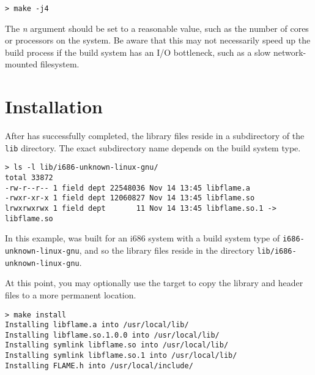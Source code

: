 \begin{Verbatim}[frame=single,framesep=2.5mm,xleftmargin=5mm,commandchars=\\\{\},fontsize=\footnotesize]
> make -j4
\end{Verbatim}

\noindent
The {\em n} argument should be set to a reasonable value, such as
the number of cores or processors on the system.
Be aware that this may not necessarily speed up the build process if the
build system has an I/O bottleneck, such as a slow network-mounted
filesystem.





\section{Installation}


After \make has successfully completed, the \libflame library files
reside in a subdirectory of the {\tt lib} directory.
The exact subdirectory name depends on the build system type.

\begin{Verbatim}[frame=single,framesep=2.5mm,xleftmargin=5mm,commandchars=\\\{\},fontsize=\footnotesize]
> ls -l lib/i686-unknown-linux-gnu/
total 33872
-rw-r--r-- 1 field dept 22548036 Nov 14 13:45 libflame.a
-rwxr-xr-x 1 field dept 12060827 Nov 14 13:45 libflame.so
lrwxrwxrwx 1 field dept       11 Nov 14 13:45 libflame.so.1 -> libflame.so
\end{Verbatim}

\noindent
In this example, \libflame was built for an i686 system with a
build system type of {\tt i686-unknown-linux-gnu}, and so the
library files reside in the directory
{\tt lib/i686-unknown-linux-gnu}.

At this point, you may optionally use the \install target to copy the
library and header files to a more permanent location.

\begin{Verbatim}[frame=single,framesep=2.5mm,xleftmargin=5mm,commandchars=\\\{\},fontsize=\footnotesize]
> make install
Installing libflame.a into /usr/local/lib/
Installing libflame.so.1.0.0 into /usr/local/lib/
Installing symlink libflame.so into /usr/local/lib/
Installing symlink libflame.so.1 into /usr/local/lib/
Installing FLAME.h into /usr/local/include/
\end{Verbatim}

